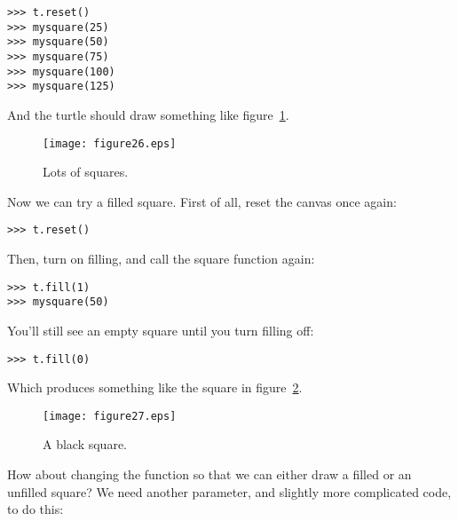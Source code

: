 \begin{listing}
\begin{verbatim}
>>> t.reset()
>>> mysquare(25)
>>> mysquare(50)
>>> mysquare(75)
>>> mysquare(100)
>>> mysquare(125)
\end{verbatim}
\end{listing}

And the turtle should draw something like figure~\ref{fig26}.

\begin{figure}
\begin{center}
\texttt{[image: figure26.eps]}
\end{center}
\caption{Lots of squares.}\label{fig26}
\end{figure}

\noindent
Now we can try a filled square.  First of all, reset the canvas once again:

\begin{listing}
\begin{verbatim}
>>> t.reset()
\end{verbatim}
\end{listing}

\noindent
Then, turn on filling, and call the square function again:

\begin{listing}
\begin{verbatim}
>>> t.fill(1)
>>> mysquare(50)
\end{verbatim}
\end{listing}

\noindent
You'll still see an empty square until you turn filling off:

\begin{listing}
\begin{verbatim}
>>> t.fill(0)
\end{verbatim}
\end{listing}

\noindent
Which produces something like the square in figure~\ref{fig27}.

\begin{figure}
\begin{center}
\texttt{[image: figure27.eps]}
\end{center}
\caption{A black square.}\label{fig27}
\end{figure}

How about changing the function so that we can either draw a filled or an unfilled square? We need another parameter, and slightly more complicated code, to do this:

